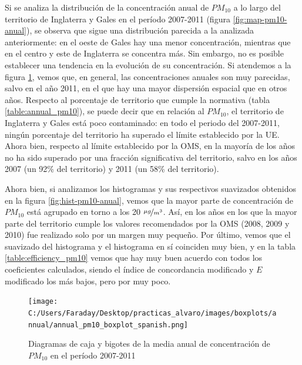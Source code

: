 \documentclass[12pt]{article}
\begin{document}
Si se analiza la distribución de la concentración anual de $PM_{10}$ a lo largo del territorio de Inglaterra y Gales en el período 2007-2011 (figura \ref{fig:map-pm10-anual}), se observa que sigue una distribución parecida a la analizada anteriormente: en el oeste de Gales hay una menor concentración, mientras que en el centro y este de Inglaterra se concentra más. Sin embargo, no es posible establecer una tendencia en la evolución de su concentración. Si atendemos a la figura \ref{fig:box_pm10_annual}, vemos que, en general, las concentraciones anuales son muy parecidas, salvo en el año 2011, en el que hay una mayor dispersión espacial que en otros años. Respecto al porcentaje de territorio que cumple la normativa (tabla \ref{table:annual_pm10}), se puede decir que en relación al $PM_{10}$, el territorio de Inglaterra y Gales está poco contaminado: en todo el periodo del 2007-2011, ningún porcentaje del territorio ha superado el límite establecido por la UE. Ahora bien, respecto al límite establecido por la OMS, en la mayoría de los años no ha sido superado por una fracción significativa del territorio, salvo en los años 2007 (un 92\% del territorio) y 2011 (un 58\% del territorio).

Ahora bien, si analizamos los histogramas y sus respectivos suavizados obtenidos en la figura \ref{fig:hist-pm10-anual}, vemos que la mayor parte de concentración de $PM_{10}$ está agrupado en torno a los 20 $\nicefrac{\mu g}{m^{3}}$. Así, en los años en los que la mayor parte del territorio cumple los valores recomendados por la OMS (2008, 2009 y 2010) fue realizado solo por un margen muy pequeño. Por último, vemos que el suavizado del histograma y el histograma en sí coinciden muy bien, y en la tabla \ref{table:efficiency_pm10} vemos que hay muy buen acuerdo con todos los coeficientes calculados, siendo el índice de concordancia modificado y $E$ modificado los más bajos, pero por muy poco.

\begin{figure}[H]
\centering
\texttt{[image: C:/Users/Faraday/Desktop/practicas\_alvaro/images/boxplots/annual/annual\_pm10\_boxplot\_spanish.png]}
\caption{Diagramas de caja y bigotes de la media anual de concentración de $PM_{10}$ en el período 2007-2011}
\label{fig:box_pm10_annual}
\end{figure}
\end{document}
